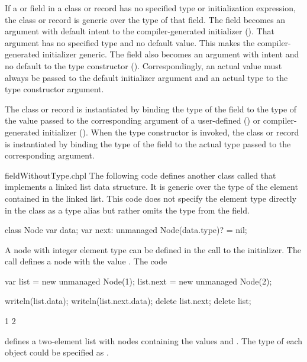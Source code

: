 If a  or  field in a class or record has no specified type or
initialization expression, the class or record is generic over the
type of that field.  The field becomes an argument with default intent to
the compiler-generated initializer ().
That argument has no specified type and no default
value. This makes the compiler-generated initializer generic.
The field also becomes an argument with  intent and no default
to the type constructor ().
Correspondingly, an actual value must always be passed to the default
initializer argument and an actual type to the type constructor argument.

The class or record is instantiated by binding the type of the field
to the type of the value passed to the corresponding argument
of a user-defined () or compiler-generated initializer ().
When the type constructor is invoked, the class or record is instantiated
by binding the type of the field to the actual type passed to
the corresponding argument.

\begin{chapelexample}{fieldWithoutType.chpl}
The following code defines another class called  that
implements a linked list data structure.  It is generic over the type
of the element contained in the linked list.  This code does not
specify the element type directly in the class as a type alias but
rather omits the type from the  field.
\begin{chapel}
class Node {
  var data;
  var next: unmanaged Node(data.type)? = nil;
}
\end{chapel}
A node with integer element type can be defined in the call to the
initializer.  The call  defines a node with the
value .  The code
\begin{chapel}
var list = new unmanaged Node(1);
list.next = new unmanaged Node(2);
\end{chapel}
\begin{chapelpost}
writeln(list.data);
writeln(list.next.data);
delete list.next;
delete list;
\end{chapelpost}
\begin{chapeloutput}
1
2
\end{chapeloutput}
defines a two-element list with nodes containing the values 
and .  The type of each object could be specified
as .
\end{chapelexample}

